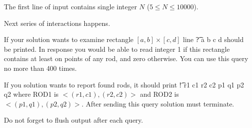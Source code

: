 The first line of input contains single integer $N$ ($5 \le N \le 10000$). 

Next series of interactions happens. 

If your solution wants to examine rectangle $[a,b] \times [c,d]$ line \t{? a b c d} should be printed. In response you would be able to read integer 1 if this rectangle contains at least on points of any rod, and zero otherwise. You can use this query no more than 400 times. 

If you solution wants to report found rods, it should print \t{! r1 c1 r2 c2 p1 q1 p2 q2} where ROD1 is $<(r1, c1), (r2, c2)>$ and ROD2 is $<(p1, q1), (p2, q2)>$. After sending this query solution must terminate.

Do not forget to flush output after each query. 